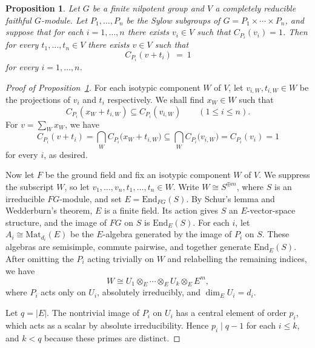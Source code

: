 \documentclass[10pt,a4paper]{amsart}
\theoremstyle{plain}
\newtheorem{proposition}[theorem]{Proposition}
\theoremstyle{definition}
\theoremstyle{remark}
\begin{document}
\begin{proposition} \label{prop:translated}
Let $G$ be a finite nilpotent group and $V$ a completely reducible
faithful $G$-module.
Let $P_1,\ldots,P_n$ be the Sylow subgroups of $G=P_1\times\cdots\times P_n$,
and suppose that for each $i = 1,\ldots,n$ there exists $v_i \in V$ such that $C_{P_i}(v_i) = 1$.
Then for every $t_1,\ldots,t_n \in V$ there exists
$v\in V$ such that 
$$ C_{P_i}(v + t_i) \> = \> 1 $$
for every $i=1,\ldots,n$.
\end{proposition}

\begin{proof}[Proof of Proposition~\ref{prop:translated}]
For each isotypic component $W$ of $V$,
let $v_{i,W},t_{i,W}\in W$ be the projections of $v_i$ and $t_i$ respectively.
We shall find $x_W \in W$ such that
\begin{equation} \label{eq:component-containment}
    C_{P_i}(x_W+t_{i,W}) \subseteq C_{P_i}(v_{i,W})
    \qquad (1\leqslant i\le n).
\end{equation}
For $v=\sum_W x_W$, we have
\[
    C_{P_i}(v+t_i)
    =\bigcap_W C_{P_i}\bigl(x_W+ t_{i,W} \bigr)
    \subseteq \bigcap_W C_{P_i}\bigl(v_{i,W}\bigr)
    =C_{P_i}(v_i)=1
\]
for every $i$, as desired.

Now let $F$ be the ground field and fix an isotypic component $W$ of $V$.
We suppress the subscript $W$, so let $v_1,\ldots,v_n,t_1,\ldots,t_n \in W$.
Write $W \cong S^{\oplus m}$, where $S$ is an irreducible $FG$-module,
and set $E=\mathrm{End}_{FG}(S)$.
By Schur's lemma and Wedderburn's theorem, $E$ is a finite field.
Its action gives $S$ an $E$-vector-space structure,
and the image of $FG$ on $S$ is $\mathrm{End}_E(S)$.
For each $i$, let $A_i \cong \mathrm{Mat}_{d_i}(E)$ be the $E$-algebra generated by the image of $P_i$ on $S$.
These algebras are semisimple, commute pairwise, and together generate $\mathrm{End}_E(S)$.
After omitting the $P_i$ acting trivially on $W$
and relabelling the remaining indices, we have
\[
    W\cong U_1\otimes_E\cdots\otimes_E U_k\otimes_E E^m,
\]
where $P_i$ acts only on $U_i$, absolutely irreducibly, and $\dim_E U_i=d_i$.

Let $q=|E|$.
The nontrivial image of $P_i$ on $U_i$ has a central element of order $p_i$,
which acts as a scalar by absolute irreducibility.
Hence $p_i\mid q-1$ for each $i\leqslant k$, and $k<q$ because these primes are distinct.


\end{proof}
\end{document}

